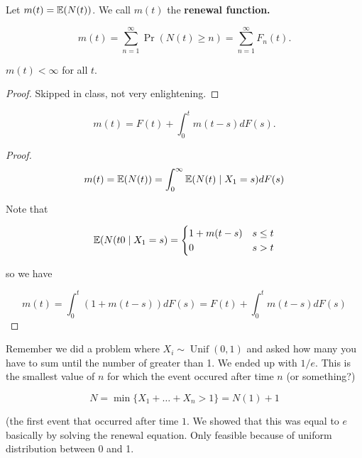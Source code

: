\begin{definition} Let \(m(t) = \E(N(t))\). We call \(m(t)\) the \textbf{renewal function.}

\end{definition}

\begin{remark}

\[
m(t) = \sum_{n=1}^\infty \Pr(N(t) \geq n) = \sum_{n=1}^\infty F_n(t).
\]

\end{remark}

\begin{lemma} \(m(t) < \infty\) for all \(t\).

\end{lemma}

\begin{proof} Skipped in class, not very enlightening.

\end{proof}

\begin{proposition}

\[
m(t)  = F(t) + \int_0^t m(t-s) dF(s).
\]

\end{proposition}

\begin{proof}

\[
m(t) = \E(N(t)) = \int_0^\infty \E(N(t) \mid X_1 =s) dF(s)
\]

Note that

\[
\E(N(t0 \mid X_1 = s) = \begin{cases}
1 + m(t-s) & s \leq t \\
0 & s > t
\end{cases}
\]

so we have

\[
m(t) = \int_0^t (1 + m(t-s)) dF(s) = F(t) + \int_0^t m(t-s) dF(s)
\]

\end{proof}

\begin{remark} Remember we did a problem where \(X_i \sim \operatorname{Unif}(0,1)\) and asked how many you have to sum until the number of greater than 1. We ended up with \(1/e\). This is the smallest value of \(n\) for which the event occured after time \(n\) (or something?)

\[
N = \min \{X_1 + \ldots + X_n > 1\} = N(1) + 1
\]

(the first event that occurred after time \(1\). We showed that this was equal to \(e\) basically by solving the renewal equation. Only feasible because of uniform distribution between 0 and 1.

\end{remark}


